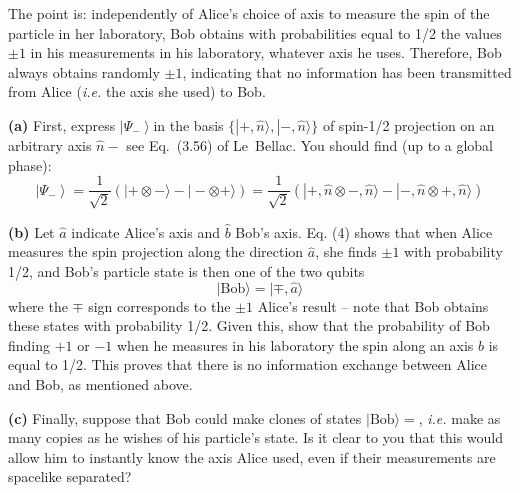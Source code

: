 \documentclass[12pt]{article}
\newcommand{\be}{\begin{equation}}
\newcommand{\ee}{\end{equation}}
\begin{document}
The point is: independently of Alice's choice of axis to measure the spin of the particle in
her laboratory, Bob obtains with probabilities equal to 1/2 the values \(\pm 1\) in his measurements in
his laboratory, whatever axis he uses. Therefore, Bob always obtains randomly \(\pm 1\), indicating
that no information has been transmitted from Alice (\textit{i.e.} the axis she used) to Bob.

\textbf{(a)} First, express \(\left|\Psi_{-}\right\rangle\)in the basis \(\{|+, \hat{n}\rangle,|-, \hat{n}\rangle\}\) of spin-1/2 projection on an arbitrary axis \(\hat{n}-\) see Eq.~(3.56) of Le~Bellac. You should find (up to a global phase):
\be
\left|\Psi_{-}\right\rangle=\frac{1}{\sqrt{2}}(|+\otimes-\rangle-|-\otimes+\rangle)=\frac{1}{\sqrt{2}}(|+, \hat{n} \otimes-, \hat{n}\rangle-|-, \hat{n} \otimes+, \hat{n}\rangle)
\ee

\textbf{(b)} Let \(\hat{a}\) indicate Alice's axis and \(\hat{b}\) Bob's axis. Eq. (4) shows that when Alice measures the
spin projection along the direction \(\hat{a}\), she finds \(\pm 1\) with probability 1/2, and Bob's particle
state is then one of the two qubits
\be
|\text{Bob}\rangle=|\mp, \hat{a}\rangle
\ee
where the \(\mp\) sign corresponds to the \(\pm 1\) Alice's result -- note that Bob obtains these states
with probability 1/2. Given this, show that the probability of Bob finding \(+1\) or \(-1\) when he
measures in his laboratory the spin along an axis \(\hat{b}\) is equal to 1/2. This proves that there is
no information exchange between Alice and Bob, as mentioned above.

\textbf{(c)} Finally, suppose that Bob could make clones of states \(|\text{Bob}\rangle=\), \textit{i.e.} make as many copies as
he wishes of his particle's state. Is it clear to you that this would allow him to instantly know
the axis Alice used, even if their measurements are spacelike separated?
\end{document}
